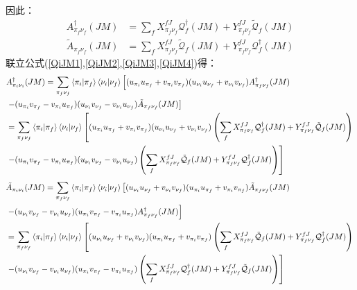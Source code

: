 \documentclass[master]{shnuthesis}
\begin{document}
因此：
\begin{align}
    A_{\pi_f\nu_f}^\dagger(JM) &= \sum_{f} X_{\pi_f\nu_f}^{fJ} \mathcal{Q}_f^\dagger(JM) + Y_{\pi_f\nu_f}^{fJ} \tilde{\mathcal{Q}}_f(JM) \label{QiJM3} \\
    \tilde{A}_{\pi_f\nu_f}(JM) &= \sum_{f} X_{\pi_f\nu_f}^{fJ} \tilde{\mathcal{Q}}_f(JM) + Y_{\pi_f\nu_f}^{fJ} \mathcal{Q}_f^\dagger(JM) \label{QiJM4}
\end{align}
联立公式(\ref{QiJM1},\ref{QiJM2},\ref{QiJM3},\ref{QiJM4})得：
\begin{align}
    & A_{\pi_i\nu_i}^\dagger(JM) = \sum_{\pi_f \nu_f} \left\langle \pi_i|\pi_f \right\rangle \left\langle \nu_i|\nu_f \right\rangle \left[(u_{\pi_i}u_{\pi_f}+v_{\pi_i}v_{\pi_f})(u_{\nu_i}u_{\nu_f}+v_{\nu_i}v_{\nu_f})A_{\pi_f \nu_f}^\dagger(JM) \right.\notag\\
    & \left.- (u_{\pi_i}v_{\pi_f}-v_{\pi_i}u_{\pi_f})(u_{\nu_i}v_{\nu_f}-v_{\nu_i}u_{\nu_f}) \tilde{A}_{\pi_f \nu_f}(JM) \right] \notag\\
    &= \sum_{\pi_f \nu_f} \left\langle \pi_i|\pi_f \right\rangle \left\langle \nu_i|\nu_f \right\rangle \left[(u_{\pi_i}u_{\pi_f}+v_{\pi_i}v_{\pi_f})(u_{\nu_i}u_{\nu_f}+v_{\nu_i}v_{\nu_f})\left(\sum_{f} X_{\pi_f\nu_f}^{fJ} \mathcal{Q}_f^\dagger(JM) + Y_{\pi_f\nu_f}^{fJ} \tilde{\mathcal{Q}}_f(JM)\right) \right.\notag\\
    & \left.- (u_{\pi_i}v_{\pi_f}-v_{\pi_i}u_{\pi_f})(u_{\nu_i}v_{\nu_f}-v_{\nu_i}u_{\nu_f}) \left(\sum_{f} X_{\pi_f\nu_f}^{fJ} \tilde{\mathcal{Q}}_f(JM) + Y_{\pi_f\nu_f}^{fJ} \mathcal{Q}_f^\dagger(JM)\right) \right] 
\end{align}
\begin{align}
    & \tilde{A}_{\pi_i\nu_i}(JM) = \sum_{\pi_f \nu_f}\left\langle \pi_i|\pi_f \right\rangle\left\langle \nu_i|\nu_f \right\rangle \left[(u_{\nu_i}u_{\nu_f}+v_{\nu_i}v_{\nu_f})(u_{\pi_i}u_{\pi_f}+v_{\pi_i}v_{\pi_f}) \tilde{A}_{\pi_f\nu_f}(JM) \right. \notag\\
    & \left. - (u_{\nu_i}v_{\nu_f}-v_{\nu_i}u_{\nu_f})(u_{\pi_i}v_{\pi_f}-v_{\pi_i}u_{\pi_f}) A_{\pi_f\nu_f}^\dagger(JM) \right] \notag\\
    &= \sum_{\pi_f \nu_f}\left\langle \pi_i|\pi_f \right\rangle\left\langle \nu_i|\nu_f \right\rangle \left[(u_{\nu_i}u_{\nu_f}+v_{\nu_i}v_{\nu_f})(u_{\pi_i}u_{\pi_f}+v_{\pi_i}v_{\pi_f}) \left(\sum_{f} X_{\pi_f\nu_f}^{fJ} \tilde{\mathcal{Q}}_f(JM) + Y_{\pi_f\nu_f}^{fJ} \mathcal{Q}_f^\dagger(JM)\right) \right. \notag\\
    & \left. - (u_{\nu_i}v_{\nu_f}-v_{\nu_i}u_{\nu_f})(u_{\pi_i}v_{\pi_f}-v_{\pi_i}u_{\pi_f}) \left(\sum_{f} X_{\pi_f\nu_f}^{fJ} \mathcal{Q}_f^\dagger(JM) + Y_{\pi_f\nu_f}^{fJ} \tilde{\mathcal{Q}}_f(JM)\right) \right]
\end{align}
\end{document}
